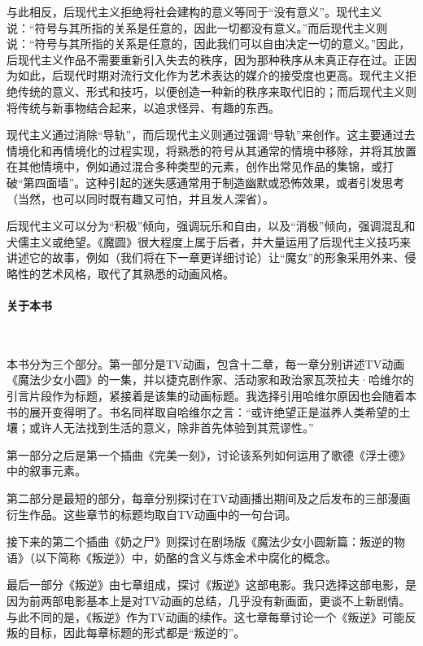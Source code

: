 与此相反，后现代主义拒绝将社会建构的意义等同于“没有意义”。现代主义说：“符号与其所指的关系是任意的，因此一切都没有意义。”而后现代主义则说：“符号与其所指的关系是任意的，因此我们可以自由决定一切的意义。”因此，后现代主义作品不需要重新引入失去的秩序，因为那种秩序从未真正存在过。正因为如此，后现代时期对流行文化作为艺术表达的媒介的接受度也更高\cite{ref5}。现代主义拒绝传统的意义、形式和技巧，以便创造一种新的秩序来取代旧的；而后现代主义则将传统与新事物结合起来，以追求怪异、有趣的东西。\cite{ref6}

现代主义通过消除“导轨”，而后现代主义则通过强调“导轨”来创作。这主要通过去情境化和再情境化的过程实现，将熟悉的符号从其通常的情境中移除，并将其放置在其他情境中，例如通过混合多种类型的元素，创作出常见作品的集锦，或打破“第四面墙”\cite{ref7}。这种引起的迷失感通常用于制造幽默或恐怖效果，或者引发思考（当然，也可以同时既有趣又可怕，并且发人深省）。

后现代主义可以分为“积极”倾向，强调玩乐和自由，以及“消极”倾向，强调混乱和犬儒主义或绝望\cite{ref8}。《魔圆》很大程度上属于后者，并大量运用了后现代主义技巧来讲述它的故事，例如（我们将在下一章更详细讨论）让“魔女”的形象采用外来、侵略性的艺术风格，取代了其熟悉的动画风格。
\paragraph{关于本书}~{}

本书分为三个部分。第一部分是TV动画，包含十二章，每一章分别讲述TV动画《魔法少女小圆》的一集，并以捷克剧作家、活动家和政治家瓦茨拉夫·哈维尔的引言片段作为标题，紧接着是该集的动画标题。我选择引用哈维尔原因也会随着本书的展开变得明了。书名同样取自哈维尔之言：“或许绝望正是滋养人类希望的土壤；或许人无法找到生活的意义，除非首先体验到其荒谬性。” \cite{ref9} 

第一部分之后是第一个插曲《完美一刻》，讨论该系列如何运用了歌德《浮士德》中的叙事元素。

第二部分是最短的部分，每章分别探讨在TV动画播出期间及之后发布的三部漫画衍生作品。这些章节的标题均取自TV动画中的一句台词。

接下来的第二个插曲《奶之尸》则探讨在剧场版《魔法少女小圆新篇：叛逆的物语》（以下简称《叛逆》）中，奶酪的含义与炼金术中腐化的概念。

最后一部分《叛逆》由七章组成，探讨《叛逆》这部电影。我只选择这部电影，是因为前两部电影基本上是对TV动画的总结，几乎没有新画面，更谈不上新剧情。与此不同的是，《叛逆》作为TV动画的续作\cite{ref10}。这七章每章讨论一个《叛逆》可能反叛的目标，因此每章标题的形式都是“叛逆的\underline{\makebox[1cm]{}}”。

